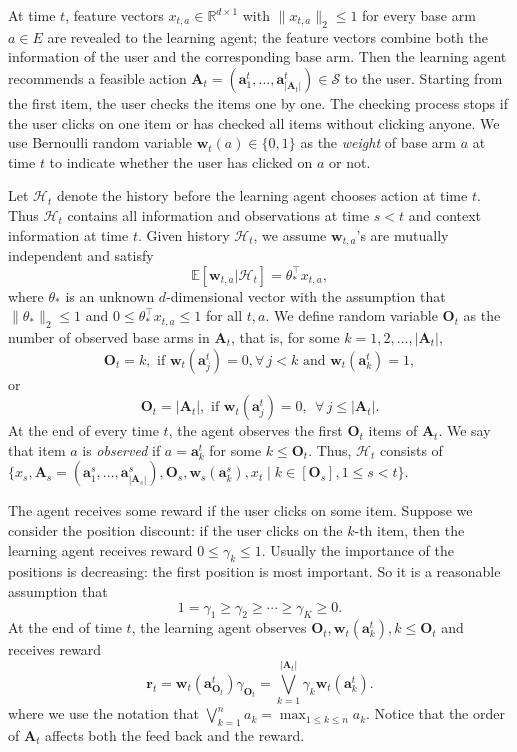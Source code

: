 \documentclass{article}
\newcommand{\EE}{\mathbb{E}}
\newcommand{\RR}{\mathbb{R}}
\newcommand{\bA}{\mathbf{A}}
\newcommand{\ba}{\mathbf{a}}
\newcommand{\bO}{\mathbf{O}}
\newcommand{\br}{\mathbf{r}}
\newcommand{\bw}{\mathbf{w}}
\newcommand{\cH}{\mathcal{H}}
\newcommand{\cS}{\mathcal{S}}
\newcommand{\abs}[1]{\left| #1 \right|}
\newcommand{\norm}[1]{\| #1 \|}
\begin{document}
At time $t$, feature vectors $x_{t,a} \in \RR^{d \times 1}$ with $\norm{x_{t,a}}_2 \leq 1$ for every base arm $a \in E$ are revealed to the learning agent; the feature vectors combine both the information of the user and the corresponding base arm. Then the learning agent recommends a feasible action $\bA_t=(\ba_{1}^t,...,\ba_{\abs{\bA_t}}^t) \in \cS$ to the user. 
Starting from the first item, the user checks the items one by one. The checking process stops if the user clicks on one item or has checked all items without clicking anyone. We use Bernoulli random variable $\bw_{t}(a) \in \{0,1\}$ as the {\em weight} of base arm $a$ at time $t$ to indicate whether the user has clicked on $a$ or not. 

Let $\cH_t$ denote the history before the learning agent chooses action at time $t$.
Thus $\cH_t$ contains all information and observations at time $s < t$ and context information at time $t$. Given history $\cH_t$, we assume $\bw_{t,a}$'s are mutually independent and satisfy
\begin{equation}
\label{eq:expectation}
\EE[\bw_{t,a} | \cH_t] = \theta_{\ast}^{\top} x_{t,a},
\end{equation}
where $\theta_{\ast}$ is an unknown $d$-dimensional vector with the assumption that $\norm{\theta_{\ast}}_2 \leq 1$ and $0 \leq \theta_{\ast}^{\top} x_{t,a} \leq 1$ for all $t, a$. 
We define random variable $\bO_t$ as the number of observed base arms in $\bA_t$, that is,
	for some $k=1,2,\ldots, \abs{\bA_t}$, 
$$
\bO_t = k, \text{ if } \bw_t(\ba_j^t)=0, \forall\, j < k \text{ and } \bw_t(\ba_k^t) = 1,
$$
or 
$$
\bO_t = \abs{\bA_t}, \text{ if }\bw_t(\ba_j^t) = 0, ~~ \forall\, j \leq \abs{\bA_t}.
$$
At the end of every time $t$, the agent observes the first $\bO_t$ items of $\bA_t$. We say that item $a$ is {\it observed} if $a = \ba_k^t$ for some $k \leq \bO_t$. 
Thus, $\cH_t$ consists of $\{x_s, \bA_s = (\ba_{1}^s,...,\ba_{\abs{\bA_s}}^s), \bO_s, \bw_s(\ba_k^s),x_t 
	\mid  k \in[\bO_s], 1 \le s<t \}$.

The agent receives some reward if the user clicks on some item. Suppose we consider the position discount: if the user clicks on the $k$-th item, then the learning agent receives reward $0 \leq \gamma_k \leq 1$. Usually the importance of the positions is decreasing: the first position is most important. So it is a reasonable assumption that
$$
1 = \gamma_1 \geq \gamma_2 \geq \cdots \geq \gamma_K \geq 0.
$$
At the end of time $t$, the learning agent observes $\bO_t, \bw_t(\ba_k^t), k \leq \bO_t$ and receives reward
$$
\br_t = \bw_t(\ba_{\bO_t}^t) \gamma_{\bO_t} = \bigvee_{k=1}^{\abs{\bA_t}} \gamma_k \bw_t(\ba_k^t).
$$
where we use the notation that $\bigvee_{k=1}^n a_k = \max_{1 \leq k \leq n} a_k$. Notice that the order of $\bA_t$ affects both the feed back and the reward.
\end{document}
